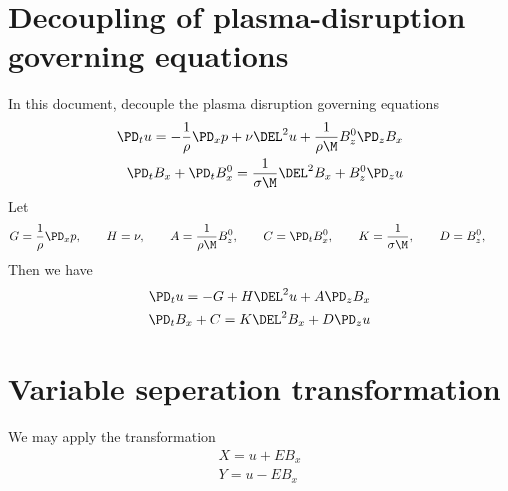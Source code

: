 \documentclass[11pt]{article}
\begin{document}
\doublespacing
\MOONSTITLE
\maketitle

\section{Decoupling of plasma-disruption governing equations}
In this document, decouple the plasma disruption governing equations
\begin{equation}\begin{aligned}
\PD_t u                 = -\frac{1}{\rho}\PD_x p+ \nu \DEL^2 u + \frac{1}{\rho \M} B_z^0 \PD_z B_x \\
\PD_t B_x + \PD_t B_x^0 = \frac{1}{\sigma \M} \DEL^2 B_x + B_z^0 \PD_z u \\
\end{aligned} \end{equation}
Let
\begin{equation}\begin{aligned}
G = \frac{1}{\rho}\PD_x p, \qquad
H = \nu, \qquad
A = \frac{1}{\rho \M} B_z^0, \qquad
C = \PD_t B_x^0, \qquad
K = \frac{1}{\sigma \M}, \qquad
D = B_z^0, \qquad
\end{aligned} \end{equation}
Then we have
\begin{equation}\begin{aligned}
\PD_t u                 = -G+ H \DEL^2 u + A \PD_z B_x \\
\PD_t B_x + C = K \DEL^2 B_x + D \PD_z u \\
\end{aligned} \end{equation}

\section{Variable seperation transformation}
We may apply the transformation
\begin{equation}\begin{aligned}
X = u + E B_x \\
Y = u - E B_x \\
\end{aligned} \end{equation}
\end{document}
